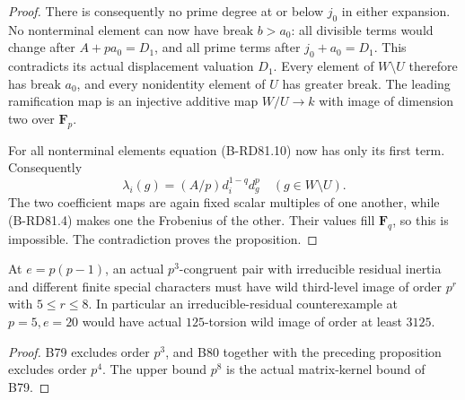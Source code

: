 \begin{proof}
There is consequently no prime degree at or below \(j_0\)
in either expansion. No nonterminal element can now have
break \(b>a_0\): all divisible terms would change after
\(A+pa_0=D_1\), and all prime terms after
\(j_0+a_0=D_1\). This contradicts its actual displacement
valuation \(D_1\). Every element of \(W\setminus U\)
therefore has break \(a_0\), and every nonidentity element
of \(U\) has greater break. The leading ramification map
is an injective additive map \(W/U\to k\) with image of
dimension two over \(\mathbf F_p\).

For all nonterminal elements equation (B-RD81.10) now has
only its first term. Consequently
\[
       \lambda_i(g)=(A/p)d_i^{1-q}d_g^p
                   \quad(g\in W\setminus U).          \tag{B-RD81.12}
\]
The two coefficient maps are again fixed scalar multiples
of one another, while (B-RD81.4) makes one the Frobenius
of the other. Their values fill \(\mathbf F_q\), so this
is impossible. The contradiction proves the proposition.
\end{proof}

\begin{corollary}
\label{cor:B-RD81}
At \(e=p(p-1)\), an actual \(p^3\)-congruent pair with
irreducible residual inertia and different finite special
characters must have wild third-level image of order \(p^r\)
with \(5\le r\le8\). In particular an irreducible-residual
counterexample at \(p=5,e=20\) would have actual
\(125\)-torsion wild image of order at least \(3125\).
\end{corollary}
\begin{proof}
B79 excludes order \(p^3\), and B80 together with the
preceding proposition excludes order \(p^4\). The upper
bound \(p^8\) is the actual matrix-kernel bound of B79.
\end{proof}

